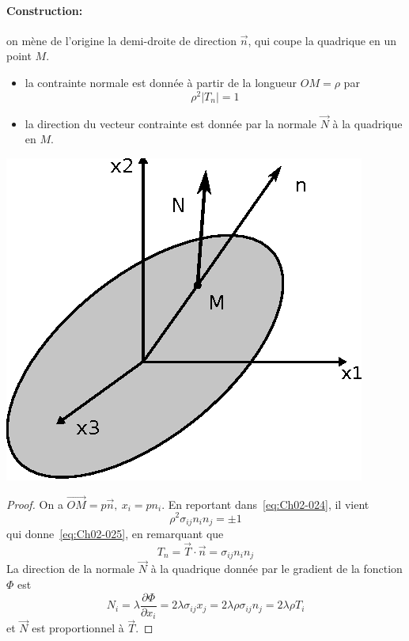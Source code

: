 \paragraph{Construction:} on mène de l'origine la demi-droite de direction $\vec{n}$, qui coupe la quadrique en un point $M$.  
\begin{itemize}
    \item la contrainte normale  est donnée  à  partir de  la longueur $OM=\rho$ par
        \begin{equation}
            \rho^2 |T_n| = 1
            \label{eq:Ch02-025}
        \end{equation}
    \item la direction du vecteur contrainte est donnée par la normale $\vec{N}$ à la quadrique en $M$. 
\end{itemize}
\begin{multicols}{2}
    \begin{center}
        \includegraphics[scale=1.1]{../images/T1_Ch02-0011}
    \end{center}
    \columnbreak
    \begin{proof}
        On a $\vec{OM} = p \vec{n},\ x_i = p n_i$.
    En reportant dans~\eqref{eq:Ch02-024}, il vient
    \begin{displaymath}
        \rho^2 \sigma_{ij} n_i n_j = \pm 1
    \end{displaymath}
    qui donne~\eqref{eq:Ch02-025}, en remarquant que
    \begin{displaymath}
        T_n = \vec{T} \cdot \vec{n} = \sigma_{ij} n_i n_j
    \end{displaymath}
    La direction de la normale $\vec{N}$ à la quadrique donnée par le gradient de la fonction $\Phi$  est  
    \begin{displaymath}
        N_i = \lambda \frac{\partial \Phi}{\partial x_i} = 2\lambda \sigma_{ij} x_j = 2 \lambda \rho \sigma_{ij} n_j = 2 \lambda \rho T_i
    \end{displaymath}
    et $\vec{N}$ est proportionnel à $\vec{T}$.
    \end{proof}
\end{multicols}
